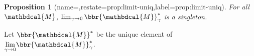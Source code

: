 \documentclass[letterpaper]{article} %
\theoremstyle{plain}
\newtheorem{prop}[theorem]{Proposition}
\theoremstyle{definition}
\theoremstyle{remark}
\newcommand{\begthm}[3][]{\begin{#2}[{name=#1},restate=#3,label=#3]}
\newcommand{\commentout}[1]{\ignorespaces}
\let\H\relax
\DeclareMathOperator{\H}{\mathrm{H}} %
\newcommand\mat[1]{\mathbf{#1}}
\newcommand{\bp}[1][L]{\mat{p}_{\!_{#1}\!}}
\newcommand{\dg}[1]{\mathbdcal{#1}}
\newcommand\Inc{\mathit{Inc}}
\newcommand{\ed}[3]{#2\!%
  \overset{\smash{\mskip-5mu\raisebox{-1pt}{$\scriptscriptstyle
        #1$}}}{\rightarrow}\! #3}
\newcommand{\alle}[1][L]{_{ \ed {#1}XY}}
\begin{document}
\begthm{prop}{prop:limit-uniq}
    For all $\dg M$, $\lim_{\gamma\to0}\bbr{\dg M}_\gamma^*$ is a singleton.
\end{prop}
%
Let $\bbr{{\dg M}}^*$ be the unique element of $\smash{\lim\limits_{\gamma
	\rightarrow 0}} \bbr{{\dg M}}_\gamma^*$. 
%
\commentout{
	There is a unique such distribution because, as we now
	show, the score is strongly convex
	which can be found efficiently \cite{strongconvexopt}.
    \begin{prop}\label{prop:u-convex}
      $\bbr{\dg M}_\gamma(\mu)$ is $\gamma$-strongly convex.%
    \end{prop}
    \begin{proof}
      $\Inc_{\dg M}( \mu)$ is convex in $\mu$
      (\Cref{thm:inc-convex}), and $\gamma\sum\alle \E_{x\sim \mu_X}
      \H(\bp(x))$ is linear in $\mu$.  
		Negative entropy is $1$-strongly convex
		(\Cref{prop:neg-ent-convex}), so $- \gamma \H(\mu)$ is $\gamma$-strongly convex.
		The sum of a $\gamma$-strongly convex, linear, and
        convex functions must be $\gamma$-strongly convex. 
	\end{proof}
}%
\end{document}
